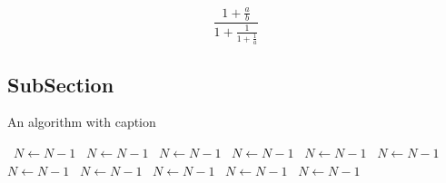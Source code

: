 \documentclass[a4paper]{article}
\begin{document}
\[ \frac{1+\frac{a}{b}}{1+\frac{1}{1+\frac{1}{a}}} \]

\subsection{SubSection}

\begin{algorithm}
\caption{An algorithm with caption}
\begin{algorithmic}
\    \State $N \gets N - 1$
\    \State $N \gets N - 1$
\    \State $N \gets N - 1$
\    \State $N \gets N - 1$
\    \State $N \gets N - 1$
\    \State $N \gets N - 1$
\    \State $N \gets N - 1$
\    \State $N \gets N - 1$
\    \State $N \gets N - 1$
\    \State $N \gets N - 1$
\    \State $N \gets N - 1$
\EndWhile
\end{algorithmic}
\end{algorithm}
\end{document}
